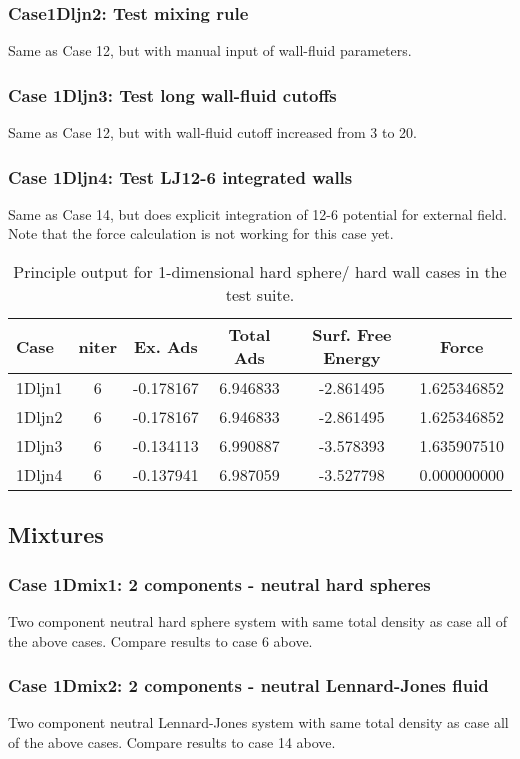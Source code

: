 \documentclass[10pt,onecolumn]{article}
\begin{document}
\subsubsection{Case1Dljn2: Test mixing rule}
Same as Case 12, but with manual input of wall-fluid parameters.

\subsubsection{Case 1Dljn3: Test long wall-fluid cutoffs}
Same as Case 12, but with wall-fluid cutoff increased from 3 to 20.

\subsubsection{Case 1Dljn4: Test LJ12-6 integrated walls}
Same as Case 14, but does explicit integration of 12-6 potential
for external field.  Note that the force calculation is not working for this case yet.


\begin{table}[h]
\begin{tabular}{|l|c|c|c|c|c|}
\hline
Case & niter & Ex. Ads & Total Ads & Surf. Free Energy & Force \\
\hline
1Dljn1 & 6 & -0.178167 & 6.946833 & -2.861495 & 1.625346852 \\
1Dljn2 & 6 & -0.178167 & 6.946833 & -2.861495 & 1.625346852 \\
1Dljn3 & 6 & -0.134113 & 6.990887 & -3.578393 & 1.635907510 \\
1Dljn4 & 6 & -0.137941 & 6.987059 & -3.527798 & 0.000000000 \\
\hline
\end{tabular}
\label{tab:table1}
\caption{Principle output for 1-dimensional hard sphere/ hard wall cases
in the test suite.}
\end{table}

\subsection{Mixtures}

\subsubsection{Case 1Dmix1: 2 components - neutral hard spheres}
Two component neutral hard sphere system with same total density as
case all of the above cases.  Compare results to case 6 above.

\subsubsection{Case 1Dmix2: 2 components - neutral Lennard-Jones fluid}
Two component neutral Lennard-Jones system with same total density as
case all of the above cases.  Compare results to case 14 above.
\end{document}
